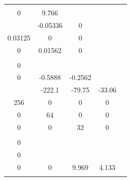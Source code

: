 \documentclass[runningheads,a4paper]{llncs}
\begin{document}
\begin{table}[htb]
\begin{tabular}{|c|c|c|c|c|}
\begin{array}{c}
8 \\ 0
\end{array}\right]$ & $\left[\begin{array}{cc}
0	& 9.766 	\\
\end{array}\right]$ & 0 \\ \hline
\begin{tabular}[c]{@{}c@{}}Magnetic\\ Pointer \end{tabular} & $\left[\begin{array}{ccc}
-0.271		& -0.05336	& 0	\\
0.03125		& 0			& 0	\\
0			& 0.01562 	& 0	\\	
\end{array}\right]$ & $\left[\begin{array}{c}
1 \\ 0 \\ 0
\end{array}\right]$ & $\left[\begin{array}{ccc}
0	& -0.5888	& -0.2562 \\
\end{array}\right]$ & 0           \\ \hline
\begin{tabular}[c]{@{}c@{}}1/4 Car\\ Suspension\end{tabular} & $
\left[\begin{array}{cccc}
-516.1	& -222.1& -79.75& -33.06	\\
256		& 0		& 0		& 0			\\
0		& 64 	& 0		& 0 \\
0		& 0		& 32 	& 0 \\	
\end{array}\right]$ & $\left[\begin{array}{c}
8 \\ 0 \\ 0 \\ 0
\end{array}\right]$ & $\left[\begin{array}{cccc}
0	& 0	& 9.969 & 4.133 \\
\end{array}\right]$ & 0 \\ \hline
\begin{tabular}[c]{@{}c@{}}Computer\\ Tape\\ Driver\end{tabular} & $\left[\begin{array}{ccc}

\end{array}
\end{tabular}
\end{table}
\end{document}

